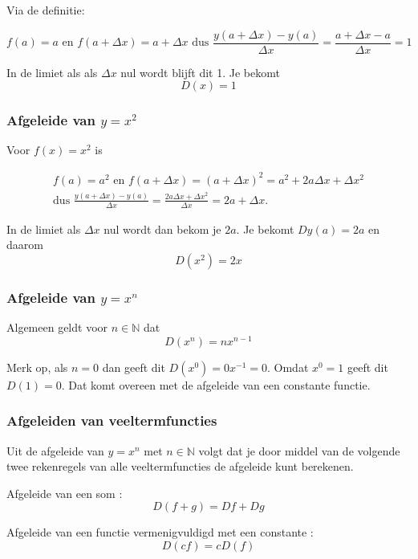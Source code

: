 Via de definitie:

\begin{equation*}
f(a)=a \text{ en } f(a+\Delta x)=a+\Delta x \text{ dus }\frac{y(a+\Delta x)-y(a)}{\Delta x}=\frac{a+\Delta x -a}{\Delta x}=1
\end{equation*}

In de limiet als als $\Delta x$ nul wordt blijft dit 1.
Je bekomt 
\[D(x)=1\]

\subsubsection{Afgeleide van $y=x^2$}

Voor $f(x)=x^2$ is

\begin{eqnarray*}
f(a)=a^2 \text{ en } f(a+\Delta x)=(a+\Delta x)^2=a^2+2a\Delta x + \Delta x^2 \\
\text{dus }
\frac{y(a+\Delta x)-y(a)}{\Delta x}=\frac{2a \Delta x +\Delta x^2}{\Delta x}=2a+ \Delta x.
\end{eqnarray*}

In de limiet als $\Delta x$ nul wordt dan bekom je $2a$.
Je bekomt $Dy(a)=2a$ en daarom 
\[D(x^2)=2x\]

\subsubsection{Afgeleide van $y=x^n$}

Algemeen geldt voor $n\in \mathbb{N}$ dat 
\[D(x^n)=nx^{n-1}\]

Merk op, als $n=0$ dan geeft dit $D(x^0)=0x^{-1}=0$.
Omdat $x^0=1$ geeft dit $D(1)=0$.
Dat komt overeen met de afgeleide van een constante functie.

\subsubsection{Afgeleiden van veeltermfuncties}

Uit de afgeleide van $y=x^n$ met $n\in \mathbb{N}$ volgt dat je door middel van de volgende twee rekenregels van alle veeltermfuncties de afgeleide kunt berekenen.

\begin{eigenschap} Afgeleide van een som : \\
\[ D(f+g)=Df+Dg\]
\end{eigenschap}

\begin{eigenschap} Afgeleide van een functie vermenigvuldigd met een constante :
\[ D(cf)=cD(f)\]
\end{eigenschap}

